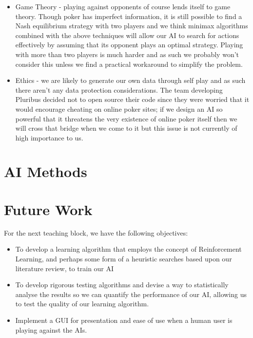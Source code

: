 \documentclass{article}
\begin{document}
\begin{multicols*}{2}
\begin{itemize}
    \item Game Theory - playing against opponents of course lends itself to game theory. Though poker has imperfect information, it is still possible to find a Nash equilibrium strategy with two players and we think minimax algorithms combined with the above techniques will allow our AI to search for actions effectively by assuming that its opponent plays an optimal strategy. Playing with more than two players is much harder and as such we probably won't consider this unless we find a practical workaround to simplify the problem.
    \item Ethics - we are likely to generate our own data through self play and as such there aren't any data protection considerations. The team developing Pluribus decided not to open source their code since they were worried that it would encourage cheating on online poker sites; if we design an AI so powerful that it threatens the very existence of online poker itself then we will cross that bridge when we come to it but this issue is not currently of high importance to us.
\end{itemize}
\section{AI Methods}


\section{Future Work}
For the next teaching block, we have the following objectives:
\begin{itemize}
    \item To develop a learning algorithm that employs the concept of Reinforcement Learning, and perhaps some form of a heuristic searches based upon our literature review, to train our AI
    \item To develop rigorous testing algorithms and devise a way to statistically analyse the results so we can quantify the performance of our AI, allowing us to test the quality of our learning algorithm.
    \item Implement a GUI for presentation and ease of use when a human user is playing against the AIs.
\end{itemize}





\end{multicols*}
\end{document}
